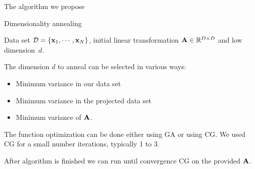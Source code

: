   The algorithm we propose
  \begin{algorithm} 
	\caption{Dimensionality annealing} 
	\label{alg:dimensionality-annealing}  
	\begin{algorithmic} [1]                 %
		\REQUIRE Data set $\mathcal{D}=\{\mathbf{x}_1,\cdots,\mathbf{x}_N\}$, initial linear
transformation $\mathbf{A}\in\mathbb{R}^{D\times D}$ and low dimension~$d$.
		  \ENDFOR
		\ENDFOR
	\end{algorithmic}
\end{algorithm}

  The dimension $d$ to anneal can be selected in various ways:
    \begin{itemize}
     \item Minimum variance in our data set
     \item Minimum variance in the projected data set
     \item Minimum variance of $\mathbf{A}$.
    \end{itemize}

    The function optimization can be done either using GA or using CG. We used CG for a small number iterations, typically 1 to 3.

    After algorithm is finished we can run until convergence CG on the provided $\mathbf{A}$.
